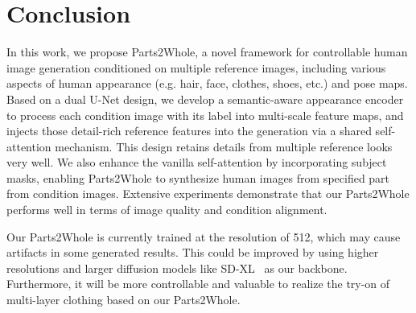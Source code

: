 \section{Conclusion}

In this work, we propose Parts2Whole, a novel framework for controllable human image generation conditioned on multiple reference images, including various aspects of human appearance (e.g. hair, face, clothes, shoes, etc.) and pose maps. Based on a dual U-Net design, we develop a semantic-aware appearance encoder to process each condition image with its label into multi-scale feature maps, and injects those detail-rich reference features into the generation via a shared self-attention mechanism. This design retains details from multiple reference looks very well. We also enhance the vanilla self-attention by incorporating subject masks, enabling Parts2Whole to synthesize human images from specified part from condition images. Extensive experiments demonstrate that our Parts2Whole performs well in terms of image quality and condition alignment.

 Our Parts2Whole is currently trained at the resolution of 512, which may cause artifacts in some generated results. This could be improved by using higher resolutions and larger diffusion models like SD-XL~\cite{podell2023sdxl} as our backbone. Furthermore, it will be more controllable and valuable to realize the try-on of multi-layer clothing based on our Parts2Whole.
